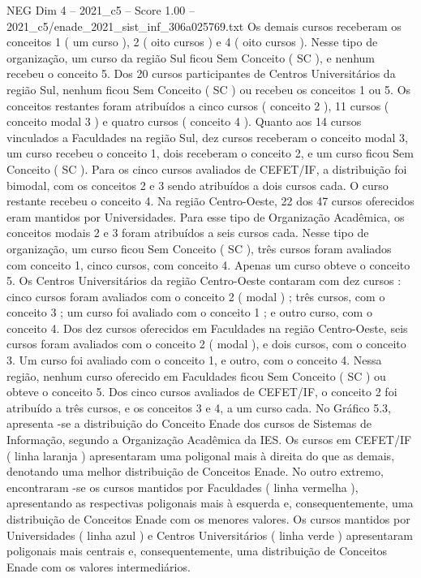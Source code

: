 \begin{textsample}{NEG Dim 4 – 2021\_c5 – Score 1.00 – 2021\_c5/enade\_2021\_sist\_inf\_306a025769.txt}
Os demais cursos receberam os conceitos 1 ( um curso ), 2 ( oito cursos ) e 4 ( oito cursos ).
Nesse tipo de organização, um curso da região Sul ficou Sem Conceito ( SC ), e nenhum recebeu o conceito 5.
Dos 20 cursos participantes de Centros Universitários da região Sul, nenhum ficou Sem Conceito ( SC ) ou recebeu os conceitos 1 ou 5.
Os conceitos restantes foram atribuídos a cinco cursos ( conceito 2 ), 11 cursos ( conceito modal 3 ) e quatro cursos ( conceito 4 ).
Quanto aos 14 cursos vinculados a Faculdades na região Sul, dez cursos receberam o conceito modal 3, um curso recebeu o conceito 1, dois receberam o conceito 2, e um curso ficou Sem Conceito ( SC ).
Para os cinco cursos avaliados de CEFET/IF, a distribuição foi bimodal, com os conceitos 2 e 3 sendo atribuídos a dois cursos cada.
O curso restante recebeu o conceito 4.
Na região Centro-Oeste, 22 dos 47 cursos oferecidos eram mantidos por Universidades.
Para esse tipo de Organização Acadêmica, os conceitos modais 2 e 3 foram atribuídos a seis cursos cada.
Nesse tipo de organização, um curso ficou Sem Conceito ( SC ), três cursos foram avaliados com conceito 1, cinco cursos, com conceito 4.
Apenas um curso obteve o conceito 5.
Os Centros Universitários da região Centro-Oeste contaram com dez cursos : cinco cursos foram avaliados com o conceito 2 ( modal ) ; três cursos, com o conceito 3 ; um curso foi avaliado com o conceito 1 ; e outro curso, com o conceito 4.
Dos dez cursos oferecidos em Faculdades na região Centro-Oeste, seis cursos foram avaliados com o conceito 2 ( modal ), e dois cursos, com o conceito 3.
Um curso foi avaliado com o conceito 1, e outro, com o conceito 4.
Nessa região, nenhum curso oferecido em Faculdades ficou Sem Conceito ( SC ) ou obteve o conceito 5.
Dos cinco cursos avaliados de CEFET/IF, o conceito 2 foi atribuído a três cursos, e os conceitos 3 e 4, a um curso cada.
No Gráfico 5.3, apresenta -se a distribuição do Conceito Enade dos cursos de Sistemas de Informação, segundo a Organização Acadêmica da IES.
Os cursos em CEFET/IF ( linha laranja ) apresentaram uma poligonal mais à direita do que as demais, denotando uma melhor distribuição de Conceitos Enade.
No outro extremo, encontraram -se os cursos mantidos por Faculdades ( linha vermelha ), apresentando as respectivas poligonais mais à esquerda e, consequentemente, uma distribuição de Conceitos Enade com os menores valores.
Os cursos mantidos por Universidades ( linha azul ) e Centros Universitários ( linha verde ) apresentaram poligonais mais centrais e, consequentemente, uma distribuição de Conceitos Enade com os valores intermediários.

\end{textsample}
